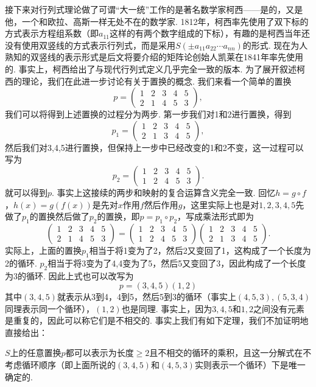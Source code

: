 接下来对行列式理论做了可谓``大一统''工作的是著名数学家柯西——是的，又是他，一个和欧拉、高斯一样无处不在的数学家. 1812年，柯西率先使用了双下标的方式表示方程组系数（即$a_{11}$这样的有两个数字组成的下标），有趣的是柯西当年还没有使用双竖线的方式表示行列式，而是采用$S(\pm a_{11}a_{22}\cdots a_{nn})$的形式. 现在为人熟知的双竖线的表示形式是后文将要介绍的矩阵论创始人凯莱在1841年率先使用的. 事实上，柯西给出了与现代行列式定义几乎完全一致的版本. 为了展开叙述柯西的理论，我们在此进一步讨论有关于置换的概念. 我们来看一个简单的置换
\[p=\begin{pmatrix}
        1 & 2 & 3 & 4 & 5 \\
        2 & 1 & 4 & 5 & 3
    \end{pmatrix},\]
我们可以将得到上述置换的过程分为两步. 第一步我们对1和2进行置换，得到
\[p_1=\begin{pmatrix}
        1 & 2 & 3 & 4 & 5 \\
        2 & 1 & 3 & 4 & 5
    \end{pmatrix},\]
然后我们对3,4,5进行置换，但保持上一步中已经改变的1和2不变，这一过程可以写为
\[p_2=\begin{pmatrix}
        1 & 2 & 3 & 4 & 5 \\
        1 & 2 & 4 & 5 & 3
    \end{pmatrix}.\]
就可以得到$p$. 事实上这接续的两步和映射的复合运算含义完全一致. 回忆$h=g\circ f$，$h(x)=g(f(x))$是先对$x$作用$f$然后作用$g$，这里实际上也是对$1,2,3,4,5$先做了$p_1$的置换然后做了$p_2$的置换，即$p=p_1\circ p_2$，写成乘法形式即为
\[\begin{pmatrix}
        1 & 2 & 3 & 4 & 5 \\
        2 & 1 & 4 & 5 & 3
    \end{pmatrix}=\begin{pmatrix}
        1 & 2 & 3 & 4 & 5 \\
        1 & 2 & 4 & 5 & 3
    \end{pmatrix}\begin{pmatrix}
        1 & 2 & 3 & 4 & 5 \\
        2 & 1 & 3 & 4 & 5
    \end{pmatrix}.\]
实际上，上面的置换$p_1$相当于将1变为了2，然后2又变回了1，这构成了一个长度为2的循环. $p_2$相当于将3变为了4,4变为了5，然后5又变回了3，因此构成了一个长度为3的循环. 因此上式也可以改写为
\[p=(3,4,5)(1,2)\]
其中$(3,4,5)$就表示从3到4，4到5，然后5到3的循环（事实上$(4,5,3),(5,3,4)$同理表示同一个循环），$(1,2)$也是同理. 事实上，因为$3,4,5$和$1,2$之间没有元素是重复的，因此可以称它们是不相交的. 事实上我们有如下定理，我们不加证明地直接给出：
\begin{theorem}{}{}
    $S$上的任意置换$p$都可以表示为长度$\geqslant 2$且不相交的循环的乘积，且这一分解式在不考虑循环顺序（即上面所说的$(3,4,5)$和$(4,5,3)$实则表示一个循环）下是唯一确定的.
\end{theorem}

